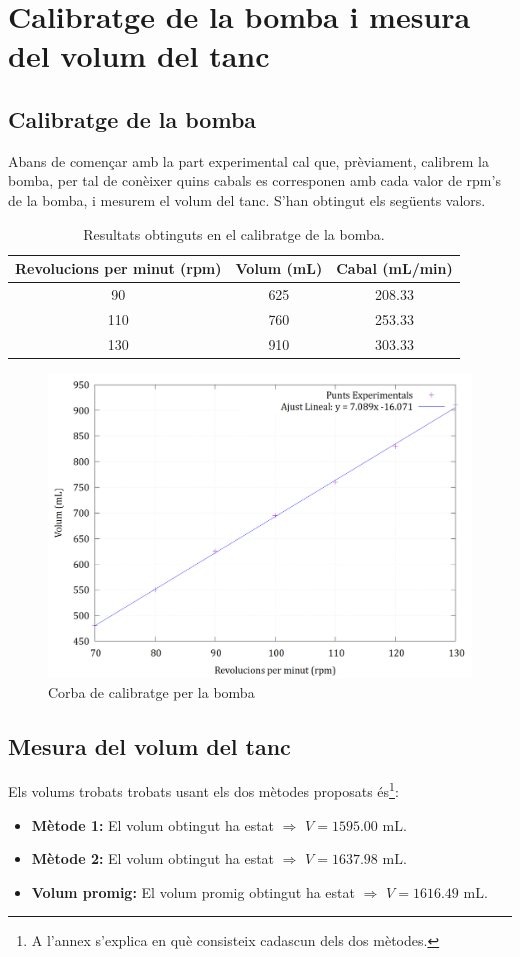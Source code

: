\documentclass[10pt, twoside]{article}
\begin{document}
\section{Calibratge de la bomba i mesura del volum del tanc}
\subsection{Calibratge de la bomba}
Abans de començar amb la part experimental cal que, prèviament, calibrem la bomba, per tal de conèixer quins cabals es corresponen amb cada valor de rpm's de la bomba, i mesurem el volum del tanc. S'han obtingut els següents valors.
\begin{table}[h!]
    \centering
    \caption{Resultats obtinguts en el calibratge de la bomba.}
    \label{tab1}
    \begin{tabular}{|c|c|c|} %
    \hline
    Revolucions per minut (rpm) & Volum (mL) & Cabal (mL/min) \\ \hline
    90       & 625       & 208.33       \\ \hline
    110      & 760       & 253.33       \\ \hline
    130      & 910       & 303.33       \\ \hline
    \end{tabular}
\end{table}
 
\begin{figure}[h]
    \centering
    \includegraphics[width=0.7\linewidth]{calbombagnu.png}
    \caption{Corba de calibratge per la bomba}
    \label{fig1}
\end{figure}
 
\subsection{Mesura del volum del tanc}
Els volums trobats trobats usant els dos mètodes proposats és\footnote{A l'annex s'explica en què consisteix cadascun dels dos mètodes.}:
\begin{itemize}
    \item \textbf{Mètode 1: }El volum obtingut ha estat $\Rightarrow$ $\boxed{V = 1595.00 \text{ mL}}$.
    \item \textbf{Mètode 2: }El volum obtingut ha estat $\Rightarrow$ $\boxed{V = 1637.98 \text{ mL}}$.
    \item \textbf{Volum promig: }El volum promig obtingut ha estat $\Rightarrow$ $\boxed{V = 1616.49 \text{ mL}}$.
\end{itemize}
\end{document}
